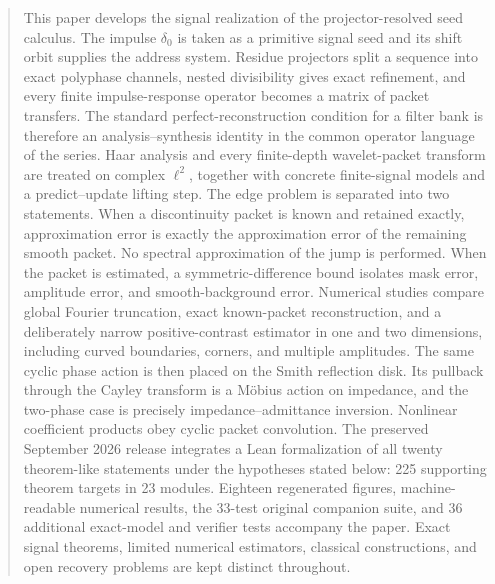 \documentclass[11pt,letterpaper]{article}
\theoremstyle{plain}
\theoremstyle{plain}
\theoremstyle{plain}
\theoremstyle{definition}
\theoremstyle{definition}
\theoremstyle{definition}
\theoremstyle{definition}
\theoremstyle{remark}
\theoremstyle{remark}
\theoremstyle{remark}
\theoremstyle{remark}
\begin{document}
\begin{abstract}
This paper develops the signal realization of the projector-resolved seed calculus. The impulse $\delta_0$ is taken as a primitive signal seed and its shift orbit supplies the address system. Residue projectors split a sequence into exact polyphase channels, nested divisibility gives exact refinement, and every finite impulse-response operator becomes a matrix of packet transfers. The standard perfect-reconstruction condition for a filter bank is therefore an analysis--synthesis identity in the common operator language of the series. Haar analysis and every finite-depth wavelet-packet transform are treated on complex $\ell^2$, together with concrete finite-signal models and a predict--update lifting step. The edge problem is separated into two statements. When a discontinuity packet is known and retained exactly, approximation error is exactly the approximation error of the remaining smooth packet. No spectral approximation of the jump is performed. When the packet is estimated, a symmetric-difference bound isolates mask error, amplitude error, and smooth-background error. Numerical studies compare global Fourier truncation, exact known-packet reconstruction, and a deliberately narrow positive-contrast estimator in one and two dimensions, including curved boundaries, corners, and multiple amplitudes. The same cyclic phase action is then placed on the Smith reflection disk. Its pullback through the Cayley transform is a M\"obius action on impedance, and the two-phase case is precisely impedance--admittance inversion. Nonlinear coefficient products obey cyclic packet convolution. The preserved September 2026 release integrates a Lean formalization of all twenty theorem-like statements under the hypotheses stated below: 225 supporting theorem targets in 23 modules. Eighteen regenerated figures, machine-readable numerical results, the 33-test original companion suite, and 36 additional exact-model and verifier tests accompany the paper. Exact signal theorems, limited numerical estimators, classical constructions, and open recovery problems are kept distinct throughout.
\end{abstract}
\end{document}

